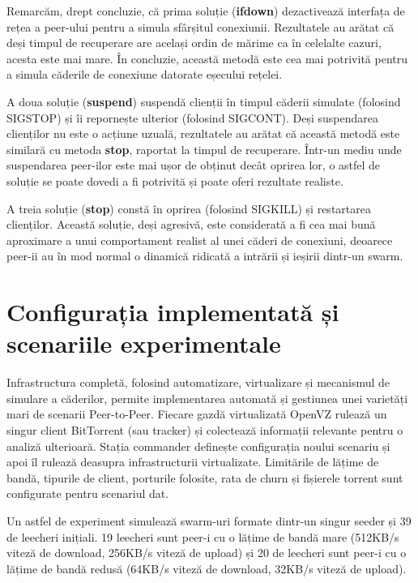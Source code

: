 Remarcăm, drept concluzie, că prima soluție (\textbf{ifdown}) dezactivează
interfața de rețea a peer-ului pentru a simula sfârșitul conexiunii.
Rezultatele au arătat că deși timpul de recuperare are același ordin de
mărime ca în celelalte cazuri, acesta este mai mare. În concluzie, această
metodă este cea mai potrivită pentru a simula căderile de conexiune datorate
eșecului rețelei.

A doua soluție (\textbf{suspend}) suspendă clienții în timpul căderii
simulate (folosind SIGSTOP) și îi repornește ulterior (folosind SIGCONT).
Deși suspendarea clienților nu este o acțiune uzuală, rezultatele au arătat
că această metodă este similară cu metoda \textbf{stop}, raportat la timpul
de recuperare. Într-un mediu unde suspendarea peer-ilor este mai ușor de
obținut decât oprirea lor, o astfel de soluție se poate dovedi a fi
potrivită și poate oferi rezultate realiste.

A treia soluție (\textbf{stop}) constă în oprirea (folosind SIGKILL) și
restartarea clienților. Această soluție, deși agresivă, este
considerată a fi cea mai bună aproximare a unui comportament realist al
unei căderi de conexiuni, deoarece peer-ii au în mod normal o dinamică
ridicată a intrării și ieșirii dintr-un swarm.

\section{Configurația implementată și scenariile experimentale}
\label{sec:virt-infra:setup-scenarios}

Infrastructura completă, folosind automatizare, virtualizare și mecanismul
de simulare a căderilor, permite implementarea automată și gestiunea
unei varietăți mari de scenarii Peer-to-Peer. Fiecare gazdă virtualizată
OpenVZ rulează un singur client BitTorrent (sau tracker) și colectează
informații relevante pentru o analiză ulterioară. Stația commander
definește configurația noului scenariu și apoi îl rulează deasupra
infrastructurii virtualizate. Limitările de lățime de bandă, tipurile
de client, porturile folosite, rata de churn și fișierele torrent sunt
configurate pentru scenariul dat.

Un astfel de experiment simulează swarm-uri formate dintr-un singur
seeder și 39 de leecheri inițiali. 19 leecheri sunt peer-i cu o lățime
de bandă mare (512KB/s viteză de download, 256KB/s viteză de upload)
și 20 de leecheri sunt peer-i cu o lățime de bandă redusă (64KB/s viteză
de download, 32KB/s viteză de upload).

